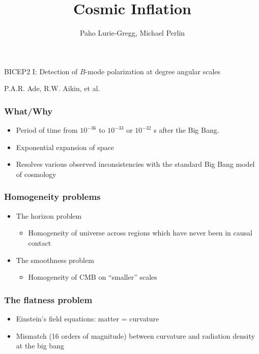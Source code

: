 \documentclass[]{beamer}
\title{Cosmic Inflation}
\author{Paho Lurie-Gregg, Michael Perlin}
\date{}
\begin{document}
\begin{frame}
  \maketitle
  \begin{center}
    BICEP2 I: Detection of $B$-mode polarization at degree angular scales

    P.A.R. Ade, R.W. Aikin, et al.
    \vspace{1.5in}
  \end{center}

\end{frame}


\begin{frame}
  \frametitle{What/Why}
  \begin{itemize}
  \item Period of time from $10^{-36}$ to $10^{-33}$ or $10^{-32}$ s
    after the Big Bang.
  \item Exponential expansion of space
  \item Resolves various observed inconsistencies with the standard
    Big Bang model of cosmology
  \end{itemize}
\end{frame}

\begin{frame}
  \frametitle{Homogeneity problems}
  \begin{itemize}
  \item The horizon problem
    \begin{itemize}
    \item Homogeneity of universe across regions which have never been
      in causal contact

    \end{itemize}

  \item The smoothness problem
    \begin{itemize}
    \item Homogeneity of CMB on ``smaller'' scales
    \end{itemize}

  \end{itemize}

\end{frame}


\begin{frame}
  \frametitle{The flatness problem}
  \begin{itemize}
  \item Einstein's field equations: matter = curvature
  \item Mismatch (16 orders of magnitude) between curvature and
    radiation density at the big bang
  \end{itemize}

\end{frame}
\end{document}

